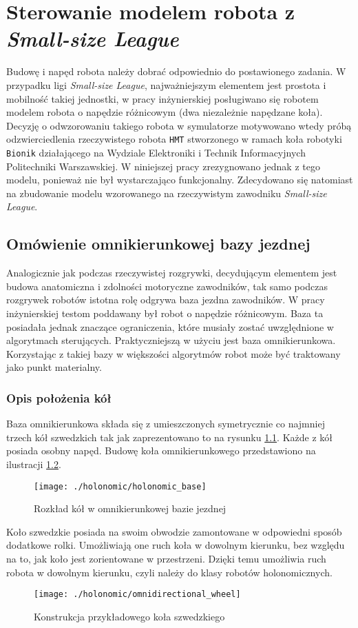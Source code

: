 \chapter[Sterowanie modelem robota z \emph{Small-size League}]{Sterowanie modelem robota z \emph{Small-size League} \label{chap:holonomic}}
Budowę i napęd robota należy dobrać odpowiednio do postawionego zadania. W przypadku ligi \emph{Small-size League}, najważniejszym elementem jest prostota i mobilność
takiej jednostki, w pracy inżynierskiej \cite{inzynierka} posługiwano się robotem modelem robota o napędzie różnicowym (dwa niezależnie napędzane koła). Decyzję o odwzorowaniu takiego robota
w symulatorze motywowano wtedy próbą odzwierciedlenia rzeczywistego robota \texttt{HMT} \cite{hamada_mgr} stworzonego w ramach koła robotyki \texttt{Bionik} działającego na Wydziale Elektroniki i Technik Informacyjnych Politechniki
Warszawskiej. W niniejszej pracy zrezygnowano jednak z tego modelu, ponieważ nie był wystarczająco funkcjonalny. Zdecydowano się natomiast na zbudowanie modelu wzorowanego na rzeczywistym zawodniku \emph{Small-size League}.  
\section{Omówienie omnikierunkowej bazy jezdnej}
Analogicznie jak podczas rzeczywistej rozgrywki, decydującym elementem jest budowa anatomiczna i zdolności motoryczne zawodników, tak samo podczas
rozgrywek robotów istotna rolę odgrywa baza jezdna zawodników. W pracy inżynierskiej testom poddawany był robot o napędzie różnicowym. Baza ta posiadała jednak 
znaczące ograniczenia, które musiały zostać uwzględnione w algorytmach sterujących. Praktyczniejszą w użyciu jest baza omnikierunkowa. Korzystając z takiej bazy w
większości algorytmów robot może być traktowany jako punkt materialny.
\subsection{Opis położenia kół}
Baza omnikierunkowa składa się z umieszczonych symetrycznie co najmniej trzech kół szwedzkich tak jak zaprezentowano to na rysunku \ref{fig:holonomic_base}.
Każde z kół posiada osobny napęd. Budowę koła omnikierunkowego przedstawiono na ilustracji \ref{fig:omnidirectional_wheel}. 
\begin{figure}[h]
\centering
\texttt{[image: ./holonomic/holonomic\_base]}
\caption{ Rozkład kół w omnikierunkowej bazie jezdnej }\label{fig:holonomic_base}
\end{figure}
Koło szwedzkie posiada na swoim
obwodzie zamontowane w odpowiedni sposób dodatkowe rolki. Umożliwiają one ruch koła w dowolnym kierunku, bez względu na to, 
jak koło jest zorientowane w przestrzeni. Dzięki temu umożliwia ruch robota w dowolnym kierunku, czyli należy do klasy robotów holonomicznych.
\begin{figure}[h]
\centering
\texttt{[image: ./holonomic/omnidirectional\_wheel]}
\caption{ Konstrukcja przykładowego koła szwedzkiego }\label{fig:omnidirectional_wheel}
\end{figure}
